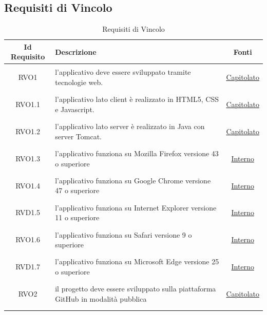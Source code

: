\subsection{Requisiti di Vincolo} \label{sec:reqvincolo}
\normalsize
\begin{longtable}{|c|>{\centering}m{7cm}|c|}
\hline
\textbf{Id Requisito} & \textbf{Descrizione} & \textbf{Fonti}\\
\hline
\endhead
\hypertarget{RVO1}{RVO1} & l'applicativo deve essere sviluppato tramite tecnologie web. & \hyperlink{Capitolato}{Capitolato}\\ \hline

\hypertarget{RVO1.1}{RVO1.1} & l'applicativo lato client è realizzato in HTML5, CSS e Javascript. & \hyperlink{Capitolato}{Capitolato}\\ \hline

\hypertarget{RVO1.2}{RVO1.2} & l'applicativo lato server è realizzato in Java con server Tomcat. & \hyperlink{Capitolato}{Capitolato}\\ \hline

\hypertarget{RVO1.3}{RVO1.3} & l'applicativo funziona su Mozilla Firefox versione 43 o superiore & \hyperlink{Interno}{Interno}\\ \hline

\hypertarget{RVO1.4}{RVO1.4} & l'applicativo funziona su Google Chrome versione 47 o superiore	 & \hyperlink{Interno}{Interno}\\ \hline

\hypertarget{RVD1.5}{RVD1.5} & l'applicativo funziona su Internet Explorer versione 11 o superiore  & \hyperlink{Interno}{Interno}\\ \hline

\hypertarget{RVO1.6}{RVO1.6} & l'applicativo funziona su Safari versione 9 o superiore & \hyperlink{Interno}{Interno}\\ \hline

\hypertarget{RVD1.7}{RVD1.7} & l'applicativo funziona su Microsoft Edge versione 25 o superiore & \hyperlink{Interno}{Interno}\\ \hline

\hypertarget{RVO2}{RVO2} & il progetto deve essere sviluppato sulla piattaforma GitHub in modalità pubblica & \hyperlink{Capitolato}{Capitolato}\\ \hline

\caption[Requisiti di Vincolo]{Requisiti di Vincolo}
\label{tabella:req3}
\end{longtable}
\clearpage

